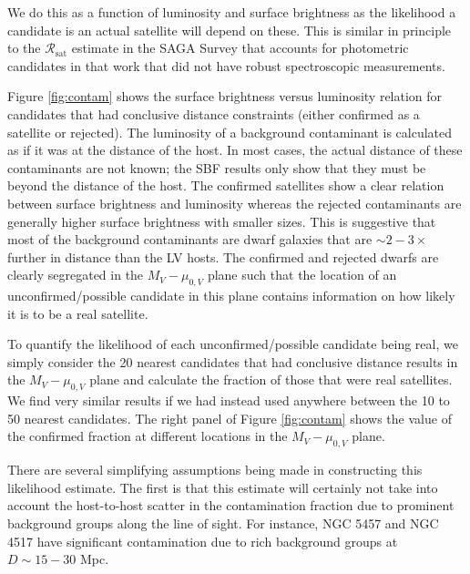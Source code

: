 \documentclass[twocolumn]{aastex62}
\begin{document}
We do this as a function of luminosity and surface brightness as the likelihood a candidate is an actual satellite will depend on these. This is similar in principle to the $\mathcal{R}_\mathrm{sat}$ estimate in the SAGA Survey \citep[see \S 5.3 of][]{mao2020} that accounts for photometric candidates in that work that did not have robust spectroscopic measurements. 

Figure \ref{fig:contam} shows the surface brightness versus luminosity relation for candidates that had conclusive distance constraints (either confirmed as a satellite or rejected). The luminosity of a background contaminant is calculated as if it was at the distance of the host. In most cases, the actual distance of these contaminants are not known; the SBF results only show that they must be beyond the distance of the host. The confirmed satellites show a clear relation between surface brightness and luminosity \citep[this is explored in more detail in][]{carlsten2021a} whereas the rejected contaminants are generally higher surface brightness with smaller sizes. This is suggestive that most of the background contaminants are dwarf galaxies that are $\sim2-3\times$ further in distance than the LV hosts. The confirmed and rejected dwarfs are clearly segregated in the $M_V-\mu_{0,V}$ plane such that the location of an unconfirmed/possible candidate in this plane contains information on how likely it is to be a real satellite. 

To quantify the likelihood of each unconfirmed/possible candidate being real, we simply consider the 20 nearest candidates that had conclusive distance results in the $M_V-\mu_{0,V}$ plane and calculate the fraction of those that were real satellites. We find very similar results if we had instead used anywhere between the 10 to 50 nearest candidates. The right panel of Figure \ref{fig:contam} shows the value of the confirmed fraction at different locations in the $M_V-\mu_{0,V}$ plane. 

There are several simplifying assumptions being made in constructing this likelihood estimate. The first is that this estimate will certainly not take into account the host-to-host scatter in the contamination fraction due to prominent background groups along the line of sight. For instance, NGC 5457 and NGC 4517 have significant contamination due to rich background groups at $D\sim15-30$ Mpc. 
\end{document}

